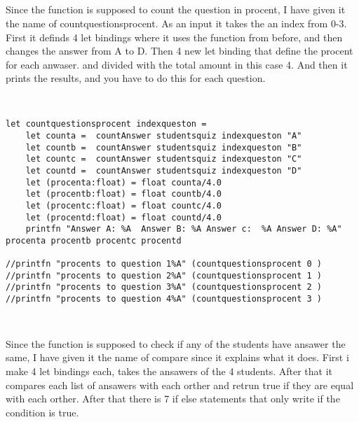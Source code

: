 \documentclass{article}
\begin{document}
\subsection{}

Since the function is supposed to count the question in procent, I have given it the name of countquestionsprocent. As an input it takes the an index from 0-3. First it definds 4 let bindings where it uses the function from before, and then changes the answer from A to D. Then 4 new let binding that define the procent for each anwaser. and divided with the total amount in this case 4. And then it prints the results, and you have to do this for each question.
 \begin{lstlisting}


let countquestionsprocent indexqueston =  
    let counta =  countAnswer studentsquiz indexqueston "A"
    let countb =  countAnswer studentsquiz indexqueston "B"
    let countc =  countAnswer studentsquiz indexqueston "C"
    let countd =  countAnswer studentsquiz indexqueston "D"
    let (procenta:float) = float counta/4.0
    let (procentb:float) = float countb/4.0
    let (procentc:float) = float countc/4.0
    let (procentd:float) = float countd/4.0
    printfn "Answer A: %A  Answer B: %A Answer c:  %A Answer D: %A"  procenta procentb procentc procentd 

//printfn "procents to question 1%A" (countquestionsprocent 0 )
//printfn "procents to question 2%A" (countquestionsprocent 1 )
//printfn "procents to question 3%A" (countquestionsprocent 2 )
//printfn "procents to question 4%A" (countquestionsprocent 3 )


    \end{lstlisting}


\subsection{}

Since the function is supposed to check if any of the students have ansawer the same,  I have given it the name of compare since it explains what it does. First i make 4 let bindings each, takes the ansawers of the 4 students. After that it compares each list of ansawers with each orther and retrun true if they are equal with each orther. After that there is 7 if else statements that only write if the condition is true.
\end{document}
